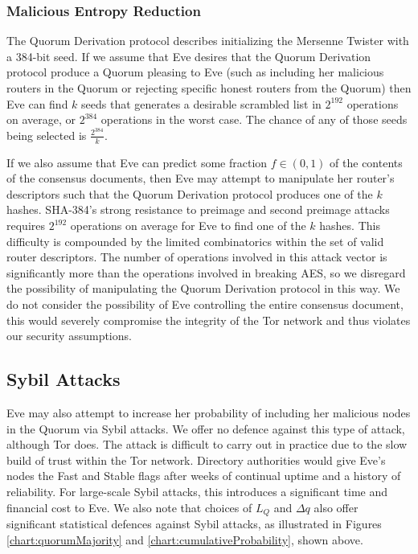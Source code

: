 \subsubsection{Malicious Entropy Reduction}

The Quorum Derivation protocol describes initializing the Mersenne Twister with a 384-bit seed. If we assume that Eve desires that the Quorum Derivation protocol produce a Quorum pleasing to Eve (such as including her malicious routers in the Quorum or rejecting specific honest routers from the Quorum) then Eve can find $ k $ seeds that generates a desirable scrambled list in $ 2^{192} $ operations on average, or $ 2^{384} $ operations in the worst case. The chance of any of those seeds being selected is $ \frac{2^{384}}{k} $. 

If we also assume that Eve can predict some fraction $ f \in {(0, 1)} $ of the contents of the consensus documents, then Eve may attempt to manipulate her router's descriptors such that the Quorum Derivation protocol produces one of the $ k $ hashes. SHA-384's strong resistance to preimage and second preimage attacks requires $ 2^{192} $ operations on average for Eve to find one of the $ k $ hashes. This difficulty is compounded by the limited combinatorics within the set of valid router descriptors. The number of operations involved in this attack vector is significantly more than the operations involved in breaking AES, so we disregard the possibility of manipulating the Quorum Derivation protocol in this way. We do not consider the possibility of Eve controlling the entire consensus document, this would severely compromise the integrity of the Tor network and thus violates our security assumptions.

\subsection{Sybil Attacks}

Eve may also attempt to increase her probability of including her malicious nodes in the Quorum via Sybil attacks. We offer no defence against this type of attack, although Tor does. The attack is difficult to carry out in practice due to the slow build of trust within the Tor network. Directory authorities would give Eve's nodes the Fast and Stable flags after weeks of continual uptime and a history of reliability. For large-scale Sybil attacks, this introduces a significant time and financial cost to Eve. We also note that choices of $ L_{Q} $ and $ \Delta q $ also offer significant statistical defences against Sybil attacks, as illustrated in Figures  \ref{chart:quorumMajority} and \ref{chart:cumulativeProbability}, shown above.

